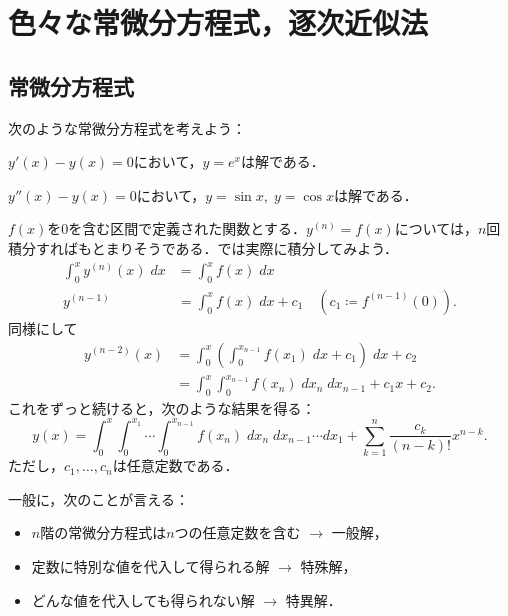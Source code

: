 \section{色々な常微分方程式，逐次近似法} %
\subsection{常微分方程式}
次のような常微分方程式を考えよう：
\begin{example}[1階の常微分方程式]
    $y'(x) - y(x) = 0$において，$y=e^x$は解である．
\end{example}

\begin{example}[2階の常微分方程式] \label{ex:2order-ode}
    $y''(x) - y(x) = 0$において，$y=\sin x, \; y=\cos x$は解である．
\end{example}

\begin{example}[$n$階の常微分方程式]
    $f(x)$を0を含む区間で定義された関数とする．$y^{(n)} = f(x)$については，$n$回積分すればもとまりそうである．では実際に積分してみよう．
    \begin{align*}
        \int_{0}^{x} y^{(n)}(x) \; dx &= \int_{0}^{x} f(x) \; dx \\
        y^{(n-1)} &= \int_{0}^{x} f(x) \; dx + c_1 \quad (c_1 \coloneqq f^{(n-1)}(0)).
    \end{align*}
    同様にして
    \begin{align*}
        y^{(n-2)}(x) &= \int_{0}^{x} \left( \int_{0}^{x_{n-1}} f(x_1) \; dx + c_1 \right) \; dx + c_2 \\
        &= \int_{0}^{x} \int_{0}^{x_{n-1}} f(x_n) \; dx_n \; dx_{n-1} + c_1x + c_2.
    \end{align*}
    これをずっと続けると，次のような結果を得る：
    \begin{equation}
        y(x) = \int_{0}^{x} \int_{0}^{x_1} \cdots \int_{0}^{x_{n-1}} f(x_n) \; dx_n \; dx_{n-1} \cdots dx_1 + \sum_{k=1}^{n} \frac{c_k}{(n-k)!}x^{n-k}.
    \end{equation}
    ただし，$c_1,\ldots,c_n$は任意定数である．

    
\end{example}

一般に，次のことが言える：
\begin{itemize}
    \item $n$階の常微分方程式は$n$つの任意定数を含む $\longrightarrow$ 一般解，
    \item 定数に特別な値を代入して得られる解 $\longrightarrow$ 特殊解，
    \item どんな値を代入しても得られない解 $\longrightarrow$ 特異解．
\end{itemize}

